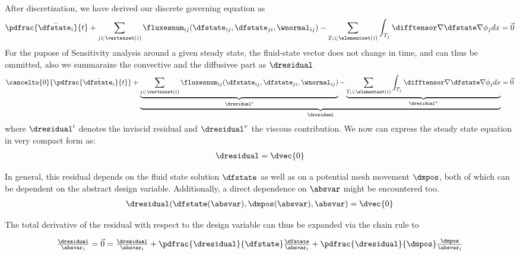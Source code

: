 \documentclass[../main.tex]{subfiles}
\begin{document}
After discretization, we have derived our discrete governing equation as 
\begin{align}\label{eq:nse_final_discretized_2}
\pdfrac{\bar{\dfstate_i}}{t} +
\sum_{j \in \vertexset(i)} \fluxesnum_{ij}(\dfstate_{ij},\dfstate_{ji},\wnormal_{ij}) -
\sum_{T_i \in \elementset(i)} \int_{T_j} \difftensor \nabla \dfstate \nabla \phi_j dx =
\vec{0}
\end{align}
For the pupose of Sensitivity analysis around a given steady state, the fluid-state vector does not change in time, and can thus be ommitted, also we summaraize the convective and the diffusivee part as $\dresidual$ 
\begin{align}\label{eq:nse_final_discretized_notationchange}
\cancelto{0}{\pdfrac{\bar{\dfstate_i}}{t}} +
\underbrace{
  \underbrace{\sum_{j \in \vertexset(i)} \fluxesnum_{ij}(\dfstate_{ij},\dfstate_{ji},\wnormal_{ij})}_{\dresidual^i} -
  \underbrace{\sum_{T_i \in \elementset(i)} \int_{T_j} \difftensor \nabla \dfstate \nabla \phi_j dx}_{\dresidual^v}      }_{\dresidual} =
\vec{0}
\end{align}
where $\dresidual^i$ denotes the inviscid residual and $\dresidual^v$ the viscous contribution.
We now can express the steady state equation in very compact form as:
\begin{align}\label{eq:discrete_steady_state}
\dresidual=\dvec{0}
\end{align}


In general, this residual depends on the fluid state solution $\dfstate$ as well as on a potential mesh movement $\dmpos$, both of which can be dependent on the abstract design variable. Additionally, a direct dependence on $\absvar$ might be encountered too.
\begin{align}
\dresidual(\dfstate(\absvar),\dmpos(\absvar),\absvar)=\dvec{0}
\end{align}

The total derivative of the residual with respect to the design variable can thus be expanded via the chain rule to

\def\DdresidualBYabsvarI{ \tfrac{\dresidual}{\absvar_i} }
\def\PdresidualBYabsvarI{ \pdfrac{\dresidual}{\absvar_i} }
\def\PdresidualBYdfstate{ \pdfrac{\dresidual}{\dfstate}  }
\def\DdfstateBYabsvarI  { \tfrac{\dfstate}{\absvar_i}   }
\def\PdresidualBYdmms   { \pdfrac{\dresidual}{\dmpos}     }
\def\DdmmsBYabsvarI     { \tfrac{\dmpos}{\absvar_i}      }
\begin{align}
\DdresidualBYabsvarI=\vec{0}=
\DdresidualBYabsvarI                      +
\PdresidualBYdfstate    \DdfstateBYabsvarI +
\PdresidualBYdmms       \DdmmsBYabsvarI
\end{align}
\end{document}
